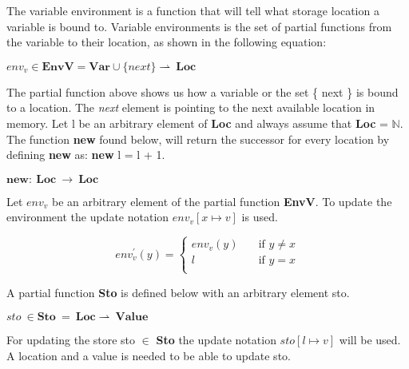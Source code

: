  The variable environment is a function that will tell what storage location a variable is bound to. Variable environments  is the set of partial functions  from the variable to their location, as shown in the following equation:
  
  \begin{math}  
	 env_v \in \boldsymbol{EnvV} = \boldsymbol{Var} \cup \{ next \} \rightharpoonup \ \boldsymbol{Loc}
  \end{math}
  
  The partial function above shows us how a variable or the set \{ next \} is bound to a location. The \textit{next} element is pointing to the next available location in memory.
  Let l be an arbitrary element of \textbf{Loc} and always assume that \textbf{Loc} = \begin{math} \mathbb{N}. \end{math} The function \textbf{new} found below, will return the successor for every location by defining \textbf{new} as: \textbf{new} l = l + 1.
  
  \begin{math}
	  \boldsymbol{new} : \ \boldsymbol{Loc} \ \rightarrow \ \boldsymbol{Loc}
  \end{math}
  
  Let \begin{math}env_v\end{math} be an arbitrary element of the partial function \textbf{EnvV}. To update the environment the update notation \begin{math}env_v [x \mapsto v] \end{math} is used. 
  
  \[ env^{'}_v(y) =
      \begin{cases}
        env_v(y)       & \quad \text{if } y \not= x\\
        l  & \quad \text{if } y = x\\
      \end{cases}
    \]
      
  A partial function \textbf{Sto} is defined below with an arbitrary element sto.
  
  \begin{math}
	  sto \ \in \boldsymbol{Sto} \ = \ \boldsymbol{Loc} \rightharpoonup \ \boldsymbol{Value}
  \end{math}
  
  For updating the store sto \begin{math} \in \end{math} \textbf{Sto} the update notation \begin{math} sto[l \mapsto v] \end{math} will be used. A location and a value is needed to be able to update sto.
  
